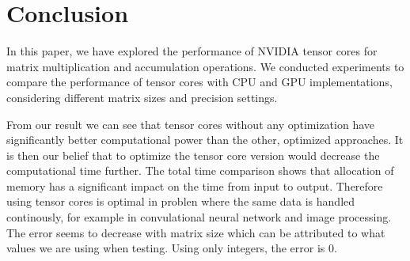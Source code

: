 \documentclass[conference]{IEEEtran}
\begin{document}
  \section{Conclusion}\label{sec:conclusion}
  
  In this paper, we have explored the performance of NVIDIA tensor cores for matrix multiplication and accumulation operations. 
  We conducted experiments to compare the performance of tensor cores with CPU and GPU implementations, 
  considering different matrix sizes and precision settings.

  From our result we can see that tensor cores without any optimization have significantly better computational power
  than the other, optimized approaches. It is then our belief that to optimize the tensor core version would 
  decrease the computational time further. The total time comparison shows that allocation of memory has a significant
  impact on the time from input to output. Therefore using tensor cores is optimal in problen where the same data is
  handled continously, for example in convulational neural network and image processing. The error seems to decrease
  with matrix size which can be attributed to what values we are using when testing. Using only integers, the error is 0.

  



\end{document}
